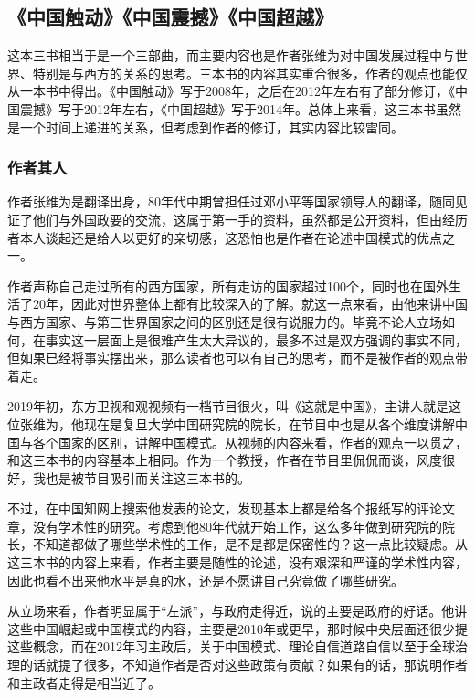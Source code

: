 \subsection{《中国触动》《中国震撼》《中国超越》}

这本三书相当于是一个三部曲，而主要内容也是作者张维为对中国发展过程中与世界、特别是与西方的关系的思考。三本书的内容其实重合很多，作者的观点也能仅从一本书中得出。《中国触动》写于2008年，之后在2012年左右有了部分修订，《中国震撼》写于2012年左右，《中国超越》写于2014年。总体上来看，这三本书虽然是一个时间上递进的关系，但考虑到作者的修订，其实内容比较雷同。

\subsubsection{作者其人}
作者张维为是翻译出身，80年代中期曾担任过邓小平等国家领导人的翻译，随同见证了他们与外国政要的交流，这属于第一手的资料，虽然都是公开资料，但由经历者本人谈起还是给人以更好的亲切感，这恐怕也是作者在论述中国模式的优点之一。

作者声称自己走过所有的西方国家，所有走访的国家超过100个，同时也在国外生活了20年，因此对世界整体上都有比较深入的了解。就这一点来看，由他来讲中国与西方国家、与第三世界国家之间的区别还是很有说服力的。毕竟不论人立场如何，在事实这一层面上是很难产生太大异议的，最多不过是双方强调的事实不同，但如果已经将事实摆出来，那么读者也可以有自己的思考，而不是被作者的观点带着走。

2019年初，东方卫视和观视频有一档节目很火，叫《这就是中国》，主讲人就是这位张维为，他现在是复旦大学中国研究院的院长，在节目中也是从各个维度讲解中国与各个国家的区别，讲解中国模式。从视频的内容来看，作者的观点一以贯之，和这三本书的内容基本上相同。作为一个教授，作者在节目里侃侃而谈，风度很好，我也是被节目吸引而关注这三本书的。

不过，在中国知网上搜索他发表的论文，发现基本上都是给各个报纸写的评论文章，没有学术性的研究。考虑到他80年代就开始工作，这么多年做到研究院的院长，不知道都做了哪些学术性的工作，是不是都是保密性的？这一点比较疑虑。从这三本书的内容上来看，作者主要是随性的论述，没有艰深和严谨的学术性内容，因此也看不出来他水平是真的水，还是不愿讲自己究竟做了哪些研究。

从立场来看，作者明显属于“左派”，与政府走得近，说的主要是政府的好话。他讲这些中国崛起或中国模式的内容，主要是2010年或更早，那时候中央层面还很少提这些概念，而在2012年习主政后，关于中国模式、理论自信道路自信以至于全球治理的话就提了很多，不知道作者是否对这些政策有贡献？如果有的话，那说明作者和主政者走得是相当近了。

